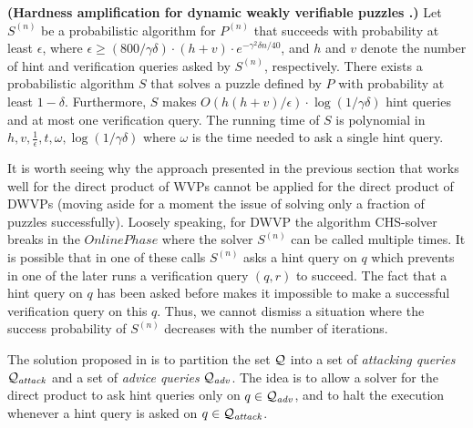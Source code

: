 \begin{theorem}\textbf{(Hardness amplification for dynamic weakly verifiable puzzles \cite{Dodis:2009:SAI:1530441.1530450}.)}
\label{lemma:dwvp}
Let $S^{(n)}$ be a probabilistic algorithm for $P^{(n)}$ that succeeds with
probability at least $\epsilon$, where $\epsilon \geq (800/\gamma\delta) \cdot (h+v) \cdot e^{-\gamma^2\delta n/40}$, and $h$ and $v$
denote the number of hint and verification queries asked by $S^{(n)}$, respectively.
There exists a probabilistic algorithm $S$ that solves a puzzle defined by $P$ with probability at least $1-\delta$.
Furthermore, $S$ makes $O(h(h+v)/\epsilon) \cdot \log(1/\gamma\delta)$ hint queries and at most one verification query.
The running time of $S$ is polynomial in $h,v,\frac{1}{\epsilon}, t, \omega, \log(1/\gamma\delta)$ where
$\omega$ is the time needed to ask a single hint query.
\end{theorem}

It is worth seeing why the approach presented in the previous section that works well for the direct product of WVPs
cannot be applied for the direct product of DWVPs (moving aside for a moment the issue of solving only a fraction of puzzles successfully).
Loosely speaking, for DWVP the algorithm CHS-solver breaks in the $\mathit{OnlinePhase}$ where the solver $S^{(n)}$ can be called multiple times.
It is possible that in one of these calls $S^{(n)}$ asks a hint query on $q$
which prevents in one of the later runs a verification query $(q,r)$ to succeed.
The fact that a hint query on $q$ has been asked before makes it impossible to make a successful verification query on this $q$.
Thus, we cannot dismiss a situation where the success probability of $S^{(n)}$ decreases with the number of iterations.

The solution proposed in \cite{Dodis:2009:SAI:1530441.1530450} is to partition the set $\mathcal{Q}$ into a set of \textit{attacking queries} $\mathcal{Q}_{\mathit{attack}}$
and a set of \textit{advice queries} $\mathcal{Q}_{\mathit{adv}}$. The idea is to allow a solver for the direct product to ask hint
queries only on $q \in \mathcal{Q}_{\mathit{adv}}$, and to halt the execution whenever a hint query is asked on $q \in \mathcal{Q}_{\mathit{attack}}$.

